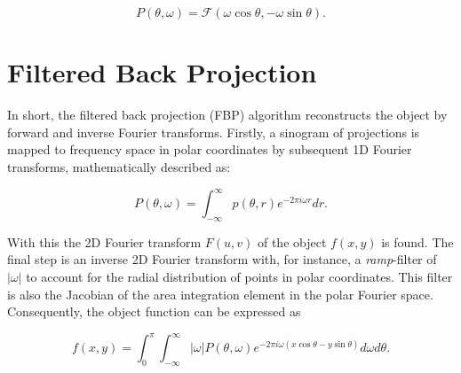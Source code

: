 \begin{equation}\label{eq:Fourier_slice}
    P(\theta, \omega) = \mathcal{F} \left( \omega \cos \theta, -\omega \sin \theta \right). %
\end{equation}




\section{Filtered Back Projection}
In short, the filtered back projection (FBP) algorithm reconstructs the object by forward and inverse Fourier transforms.
Firstly, a sinogram of projections is mapped to frequency space in polar coordinates by subsequent 1D Fourier transforms, mathematically described as:

\begin{equation}\label{eq:FBP_1}
    P(\theta, \omega) = \int_{-\infty}^{\infty} p(\theta,r)e^{-2\pi i\omega r} dr.
\end{equation}

With this the 2D Fourier transform $F(u,v)$ of the object $f(x,y)$ is found.
The final step is an inverse 2D Fourier transform with, for instance, a \emph{ramp}-filter of $|\omega|$ to account for the radial distribution of points in polar coordinates.
This filter is also the Jacobian of the area integration element in the polar Fourier space.
Consequently, the object function can be expressed as

\begin{equation}
    f(x,y) = \int_{0}^{\pi} \int_{-\infty}^{\infty} \left|\omega\right| P(\theta,\omega)e^{-2\pi i\omega (x\cos\theta - y\sin\theta)} d\omega d\theta.
\end{equation}







